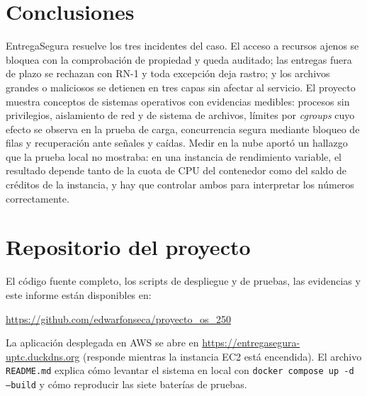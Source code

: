\documentclass[conference,a4paper]{IEEEtran}
\newcommand{\cod}[1]{\texttt{#1}}
\begin{document}
\section{Conclusiones}

EntregaSegura resuelve los tres incidentes del caso. El acceso a recursos ajenos se bloquea con la comprobación de propiedad y queda auditado; las entregas fuera de plazo se rechazan con RN-1 y toda excepción deja rastro; y los archivos grandes o maliciosos se detienen en tres capas sin afectar al servicio. El proyecto muestra conceptos de sistemas operativos con evidencias medibles: procesos sin privilegios, aislamiento de red y de sistema de archivos, límites por \textit{cgroups} cuyo efecto se observa en la prueba de carga, concurrencia segura mediante bloqueo de filas y recuperación ante señales y caídas. Medir en la nube aportó un hallazgo que la prueba local no mostraba: en una instancia de rendimiento variable, el resultado depende tanto de la cuota de CPU del contenedor como del saldo de créditos de la instancia, y hay que controlar ambos para interpretar los números correctamente.

\section*{Repositorio del proyecto}
El código fuente completo, los scripts de despliegue y de pruebas, las evidencias y este informe están disponibles en:
\begin{center}\url{https://github.com/edwarfonseca/proyecto_os_250}\end{center}
La aplicación desplegada en AWS se abre en \url{https://entregasegura-uptc.duckdns.org} (responde mientras la instancia EC2 está encendida).
El archivo \cod{README.md} explica cómo levantar el sistema en local con \cod{docker compose up -d --build} y cómo reproducir las siete baterías de pruebas.
\end{document}
